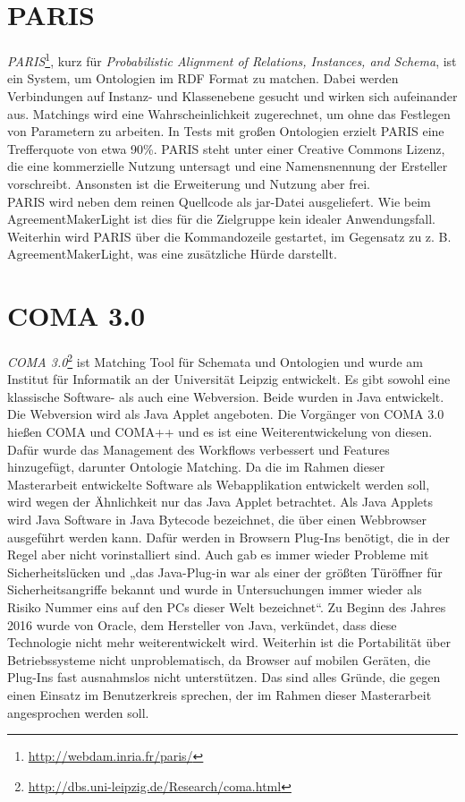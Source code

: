 		\section{PARIS}
		\textit{PARIS}\footnote{\url{http://webdam.inria.fr/paris/}}, kurz für
		\textit{Probabilistic Alignment of Relations, Instances, and Schema}, ist ein
		System, um Ontologien im RDF Format zu matchen. Dabei werden Verbindungen auf
		Instanz- und Klassenebene gesucht und wirken sich aufeinander aus. Matchings
		wird eine Wahrscheinlichkeit zugerechnet, um ohne das Festlegen von Parametern
		zu arbeiten. In Tests mit großen Ontologien erzielt PARIS eine Trefferquote
		von etwa 90\%. PARIS steht unter einer Creative Commons Lizenz, die eine
		kommerzielle Nutzung untersagt und eine Namensnennung der Ersteller
		vorschreibt. Ansonsten ist die Erweiterung und Nutzung aber frei.\\
		PARIS wird neben dem reinen Quellcode als jar-Datei ausgeliefert. Wie beim
		AgreementMakerLight ist dies für die Zielgruppe kein idealer Anwendungsfall.
		Weiterhin wird PARIS über die Kommandozeile gestartet, im Gegensatz zu z. B.
		AgreementMakerLight, was eine zusätzliche Hürde darstellt.
		
		\section{COMA 3.0}
		\textit{COMA 3.0}\footnote{\url{http://dbs.uni-leipzig.de/Research/coma.html}}
		ist Matching Tool für Schemata und Ontologien und wurde am Institut für
		Informatik an der Universität Leipzig entwickelt. Es gibt sowohl eine
		klassische Software- als auch eine Webversion. Beide wurden in Java
		entwickelt. Die Webversion wird als Java Applet angeboten. Die Vorgänger von
		COMA 3.0 hießen COMA und COMA++ und es ist eine Weiterentwickelung von diesen.
		Dafür wurde das Management des Workflows verbessert und Features hinzugefügt,
		darunter Ontologie Matching. Da die im Rahmen dieser Masterarbeit entwickelte
		Software als Webapplikation entwickelt werden soll, wird wegen der Ähnlichkeit
		nur das Java Applet betrachtet. Als Java Applets wird Java Software in Java
		Bytecode bezeichnet, die über einen Webbrowser ausgeführt werden kann. Dafür
		werden in Browsern Plug-Ins benötigt, die in der Regel aber nicht
		vorinstalliert sind. Auch gab es immer wieder Probleme mit Sicherheitslücken
		und „das Java-Plug-in war als einer der größten Türöffner für
		Sicherheitsangriffe bekannt und wurde in Untersuchungen immer wieder als
		Risiko Nummer eins auf den PCs dieser Welt bezeichnet“\cite{Heise16}. Zu
		Beginn des Jahres 2016 wurde von Oracle, dem Hersteller von Java, verkündet, dass diese
		Technologie nicht mehr weiterentwickelt wird.  Weiterhin ist die Portabilität
		über Betriebssysteme nicht unproblematisch, da Browser auf mobilen Geräten,
		die Plug-Ins fast ausnahmslos nicht unterstützen.  Das sind alles Gründe, die
		gegen einen Einsatz im Benutzerkreis sprechen, der im Rahmen dieser
		Masterarbeit angesprochen werden soll.
		
